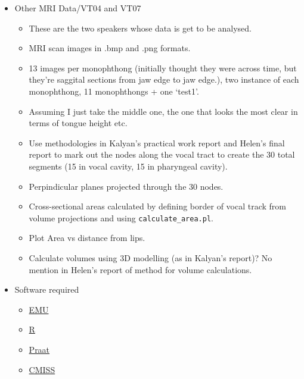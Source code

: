\documentclass{article}
\begin{document}
\begin{itemize}
    \item Other MRI Data/VT04 and VT07
    \begin{itemize}
        \item These are the two speakers whose data is get to be analysed.
        \item MRI scan images in .bmp and .png formats.
        \item 13 images per monophthong (initially thought they were across time, but they're saggital sections from jaw edge to jaw edge.), two instance of each monophthong, 11 monophthongs + one `test1'.
        \item Assuming I just take the middle one, the one that looks the most clear in terms of tongue height etc.
        \item Use methodologies in Kalyan's practical work report and Helen's final report to mark out the nodes along the vocal tract to create the 30 total segments (15 in vocal cavity, 15 in pharyngeal cavity).
        \item Perpindicular planes projected through the 30 nodes.
        \item Cross-sectional areas calculated by defining border of vocal track from volume projections and using \texttt{calculate\_area.pl}.
        \item Plot Area vs distance from lips.
        \item Calculate volumes using 3D modelling (as in Kalyan's report)? No mention in Helen's report of method for volume calculations. 
    \end{itemize}
    
    \item Software required
    \begin{itemize}
        \item \href{http://emu.sourceforge.net/}{EMU}
        \item \href{https://www.r-project.org/}{R}
        \item \href{http://www.fon.hum.uva.nl/praat/}{Praat}
        \item \href{http://www.cmiss.org/}{CMISS}
    \end{itemize}
\end{itemize}
\end{document}
